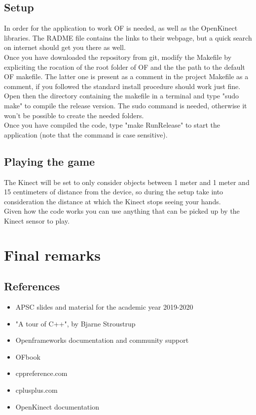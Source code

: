 \documentclass[]{article}
\begin{document}
\subsection{Setup}
In order for the application to work OF is needed, as well as the OpenKinect libraries. The RADME file contains the links to their webpage, but a quick search on internet should get you there as well.\\
Once you have downloaded the repository from git, modify the Makefile by expliciting the rocation of the root folder of OF and the the path to the default OF makefile. The latter one is present as a comment in the project Makefile as a comment, if you followed the standard install procedure should work just fine.\\  
Open then the directory containing the makefile in a terminal and type "sudo make" to compile the release version. The sudo command is needed, otherwise it won't be possible to create the needed folders.\\
Once you have compiled the code, type "make RunRelease" to start the application (note that the command is case sensitive).
\subsection{Playing the game}
The Kinect will be set to only consider objects between 1 meter and 1 meter and 15 centimeters of distance from the device, so during the setup take into consideration the distance at which the Kinect stops seeing your hands.\\
Given how the code works you can use anything that can be picked up by the Kinect sensor to play.

\newpage
\section{Final remarks}
\subsection{References}
\begin{itemize}
	\item APSC slides and material for the academic year 2019-2020
	\item "A tour of C++", by Bjarne Stroustrup
	\item Openframeworks documentation and community support
	\item OFbook
	\item cppreference.com
	\item cplusplus.com
	\item OpenKinect documentation
\end{itemize}
\end{document}
